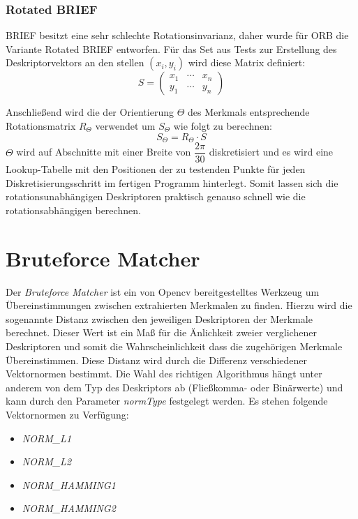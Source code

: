\subsubsection{Rotated BRIEF}
BRIEF besitzt eine sehr schlechte Rotationsinvarianz, daher wurde für ORB die Variante Rotated BRIEF entworfen.
Für das Set aus Tests zur Erstellung des Deskriptorvektors an den stellen $(x_i, y_i)$ wird diese Matrix definiert:
\begin{equation}
S=
\begin{pmatrix}
x_1 & \cdots & x_n \\
y_1 & \cdots & y_n
\end{pmatrix}
\end{equation}

Anschließend wird die der Orientierung $\Theta $ des Merkmals entsprechende Rotationsmatrix $R_\Theta$ verwendet um $S_\Theta $ wie folgt zu berechnen:
\begin{equation}
S_\Theta = R_\Theta \cdot S
\end{equation}
$\Theta$ wird auf Abschnitte mit einer Breite von $\dfrac{2\pi}{30}$ diskretisiert und es wird eine Lookup-Tabelle mit den Positionen der zu testenden Punkte für jeden Diskretisierungsschritt im fertigen Programm hinterlegt.
Somit lassen sich die rotationsunabhängigen Deskriptoren praktisch genauso schnell wie die rotationsabhängigen berechnen.

\section{Bruteforce Matcher}
Der \emph{Bruteforce Matcher} ist ein von Opencv bereitgestelltes Werkzeug um Übereinstimmungen zwischen extrahierten Merkmalen zu finden. 
Hierzu wird die sogenannte Distanz zwischen den jeweiligen Deskriptoren der Merkmale berechnet.
Dieser Wert ist ein Maß für die Änlichkeit zweier verglichener Deskriptoren und somit die Wahrscheinlichkeit dass die zugehörigen Merkmale Übereinstimmen.
Diese Distanz wird durch die Differenz verschiedener Vektornormen bestimmt.
Die Wahl des richtigen Algorithmus hängt unter anderem von dem Typ des Deskriptors ab (Fließkomma- oder Binärwerte) und kann durch den Parameter \emph{normType} festgelegt werden. Es stehen folgende Vektornormen zu Verfügung:
\begin{itemize}
\item \emph{NORM\_L1}
\item \emph{NORM\_L2}
\item \emph{NORM\_HAMMING1}
\item \emph{NORM\_HAMMING2}
\end{itemize}

